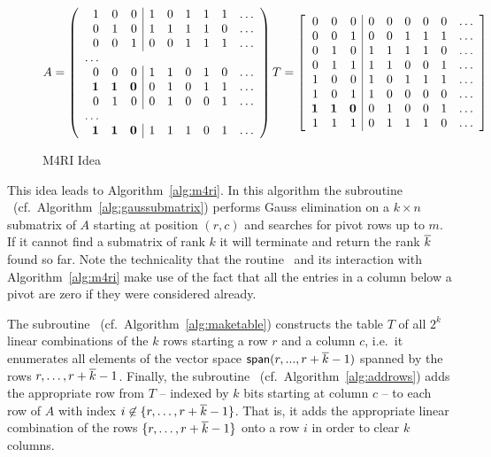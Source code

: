 \begin{figure}[htbp]
\begin{align*}
A = \left(\begin{array}{rrr|rrrrrr}
1 & 0 & 0 & 1 & 0 & 1 & 1 & 1 & \dots \\
0 & 1 & 0 & 1 & 1 & 1 & 1 & 0 & \dots \\
0 & 0 & 1 & 0 & 0 & 1 & 1 & 1 & \dots \\
\dots \\
0 & 0 & 0 & 1 & 1 & 0 & 1 & 0 & \dots \\
\bf{1} & \bf{1} & \bf{0} & 0 & 1 & 0 & 1 & 1 & \dots \\
0 & 1 & 0 & 0 & 1 & 0 & 0 & 1 & \dots \\
\dots \\
\bf{1} & \bf{1} & \bf{0} & 1 & 1 & 1 & 0 & 1 & \dots 
\end{array}\right)
T = \left[\begin{array}{rrr|rrrrrr}
0 & 0 & 0 & 0 & 0 & 0 & 0 & 0 & \dots\\
0 & 0 & 1 & 0 & 0 & 1 & 1 & 1 & \dots \\
0 & 1 & 0 & 1 & 1 & 1 & 1 & 0 & \dots \\
0 & 1 & 1 & 1 & 1 & 0 & 0 & 1 & \dots \\
1 & 0 & 0 & 1 & 0 & 1 & 1 & 1 & \dots \\
1 & 0 & 1 & 1 & 0 & 0 & 0 & 0 & \dots \\
\bf{1} & \bf{1} & \bf{0} & 0 & 1 & 0 & 0 & 1 & \dots \\
1 & 1 & 1 & 0 & 1 & 1 & 1 & 0 & \dots \\
\end{array}\right]
\end{align*}
\caption{M4RI Idea}
\label{fig:m4ri-visualisation}
\end{figure}

This idea leads to Algorithm~\ref{alg:m4ri}. In this algorithm the subroutine \gausssubmatrix\ (cf.\ Algorithm~\ref{alg:gaussubmatrix}) performs Gauss elimination on a $k \times n$ submatrix of $A$ starting at position $(r,c)$ and searches for pivot rows up to $m$. If it cannot find a submatrix of rank $k$ it will terminate and return the rank $\overline{k}$ found so far. Note the technicality that the routine \gausssubmatrix\ and its interaction with  Algorithm~\ref{alg:m4ri} make use of the fact that all the entries in a column below a pivot are zero if they were considered already.

The subroutine \maketable\ (cf.\ Algorithm~\ref{alg:maketable}) constructs the table $T$ of all $2^k$ linear combinations of the $k$ rows starting a row $r$ and a column $c$, i.e.~it enumerates all elements of the vector space $\mathsf{span}(r,...,r+\overline{k}-1)$ spanned by the rows $r,\dots, r+\overline{k}-1$. Finally, the subroutine \addrowsfromtable\ (cf.\ Algorithm~\ref{alg:addrows}) adds the appropriate row from $T$ -- indexed by $k$ bits starting at column $c$ -- to each row of $A$ with index $i \not\in \{r,\dots,r+\overline{k}-1\}$. That is, it adds the  appropriate linear combination of the rows $\{r,\dots,r+\overline{k}-1\}$  onto a row $i$ in order to clear $k$ columns.

